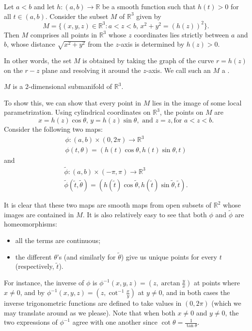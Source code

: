 \documentclass[notoc,notitlepage]{tufte-book}
\begin{document}
\begin{eg}\label{eg:parametrization_of_a_torus_in_r_n_no1}
  Let $a < b$ and let $h : (a, b) \to \mathbb{R}$ be a smooth function such that
  $h(t) > 0$ for all $t \in (a, b)$. Consider the subset $M$ of $\mathbb{R}^3$
  given by
  \begin{equation*}
    M = \{ (x, y, z) \in \mathbb{R}^3 : a < z < b, \, x^2 + y^2 = (h(z))^2 \}.
  \end{equation*}
  Then $M$ comprises all points in $\mathbb{R}^3$ whose $z$ coordinates lies
  strictly between $a$ and $b$, whose distance $\sqrt{x^2 + y^2}$ from the
  $z$-axis is determined by $h(z) > 0$.

  In other words, the set $M$ is obtained by taking the graph of the curve $r =
  h(z)$ on the $r-z$ plane and resolving it around the $z$-axis. We call such an
  $M$ a . 
  
   $M$ is a $2$-dimensional submanifold of $\mathbb{R}^3$.

  To show this, we can show that every point in $M$ lies in the image of some
  local parametrization. Using cylindrical coordinates on $\mathbb{R}^3$, the
  points on $M$ are
  \begin{equation*}
    x = h(z) \cos \theta, \, y = h(z) \sin \theta, \text{ and } z = z, \text{
    for } a < z < b.
  \end{equation*}
  Consider the following two maps:
  \begin{gather*}
    \phi : (a, b) \times (0, 2 \pi) \to \mathbb{R}^3 \\
    \phi(t, \theta) = (h(t) \cos \theta, h(t) \sin \theta, t)
  \end{gather*}
  and
  \begin{gather*}
    \tilde{\phi} : (a, b) \times (- \pi, \pi) \to \mathbb{R}^3 \\
    \tilde{\phi}(\tilde{t}, \tilde{\theta}) = (h(\tilde{t}) \cos \tilde{\theta},
    h(\tilde{t}) \sin \tilde{\theta}, \tilde{t}).
  \end{gather*}
\end{eg}
It is clear that these two maps are smooth maps from open subsets of
$\mathbb{R}^2$ whose images are contained in $M$. It is also relatively easy to
see that both $\phi$ and $\tilde{\phi}$ are homeomorphisms:
\begin{itemize}
  \item all the terms are continuous;
  \item the different $\theta$'s (and similarly for $\tilde{\theta}$) give us
    unique points for every $t$ (respectively, $\tilde{t}$).
\end{itemize}
For instance, the inverse of $\phi$ is $\phi^{-1}(x, y, z) = \left(z, \arctan
\frac{y}{x}\right)$ at points where $x \neq 0$, and by $\phi^{-1}(x, y, z) = \left(z,
\cot^{-1} \frac{x}{y}\right)$ at $y \neq 0$, and in both cases the inverse
trigonometric functions are defined to take values in $(0, 2 \pi)$ (which we may
translate around as we please). Note that when both $x \neq 0$ and $y \neq 0$,
the two expressions of $\phi^{-1}$ agree with one another since $\cot \theta =
\frac{1}{\tan \theta}$.
\end{document}
